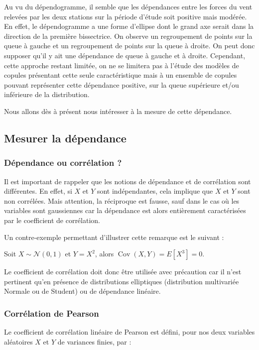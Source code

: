 Au vu du dépendogramme, il semble que les dépendances entre les forces du vent relevées par les deux stations sur la période d'étude soit positive mais modérée. 
En effet, le dépendogramme a une forme d'ellipse dont le grand axe serait dans la direction de la première bissectrice.
On observe un regroupement de points sur la queue à gauche et un regroupement de points sur la queue à droite. On peut donc supposer qu'il y ait une dépendance de queue à gauche 
et à droite. Cependant, cette approche restant limitée, on ne se limitera pas à l'étude des modèles de copules présentant cette seule caractéristique mais à un ensemble de copules
pouvant représenter cette dépendance positive, sur la queue supérieure et/ou inférieure de la distribution.

Nous allons dès à présent nous intéresser à la mesure de cette dépendance. 

\subsection{Mesurer la dépendance}

\subsubsection{Dépendance ou corrélation ?}

Il est important de rappeler que les notions de dépendance et de corrélation sont différentes.
En effet, si $X$ et $Y$ sont indépendantes, cela implique que $X$ et $Y$ sont non corrélées. Mais attention, la réciproque est fausse, sauf dans
le cas où les variables sont gaussiennes car la dépendance est alors entièrement caractérisées par le coefficient de corrélation.

Un contre-exemple permettant d'illustrer cette remarque est le suivant :

Soit $X \sim \mathcal{N}(0,1)$ et $Y = X^2$, alors $\operatorname{Cov}(X,Y) = E[X^3] = 0$.

Le coefficient de corrélation doit donc être utilisée avec précaution car il n’est pertinent qu’en présence de distributions elliptiques (distribution multivariée
Normale ou de Student) ou de dépendance linéaire.


\subsubsection{Corrélation de Pearson}

Le coefficient de corrélation linéaire de Pearson est défini, pour nos deux variables aléatoires $X$ et $Y$ de variances finies, par :

